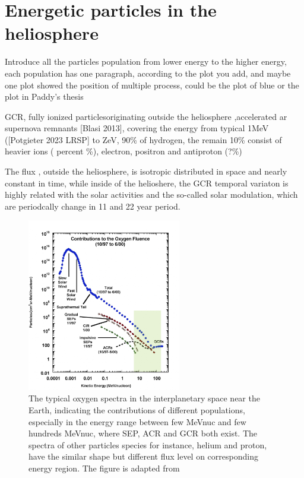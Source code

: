 \section{Energetic particles in the heliosphere}
\label{sec:particles_heliosphere}

Introduce all the particles population from lower energy to the higher energy, each population has one paragraph, according to the plot you add, and maybe one plot showed the position of multiple process, could be the plot of blue or the plot in Paddy's thesis



GCR, fully ionized particlesoriginating outside the heliosphere ,accelerated ar supernova remnants [Blasi 2013], covering the energy from typical 1MeV ([Potgieter 2023 LRSP] to ZeV, 90\% of hydrogen, the remain 10\% consist of heavier ions ( percent \%), electron, positron and antiproton (?\%)


The flux , outside the heliosphere,  is isotropic distributed in space and nearly constant in time, while inside of the helioshere, the GCR temporal variaton is highly related with the solar activities and the so-called solar modulation, which are periodcally change in 11 and 22 year period. 






\begin{figure}
	\centering
	\includegraphics[width = 0.6\textwidth]{images/heliospheric_particle_spectra_color.png}
	\caption[Energy spectra of oxygen ions in the near Earth space]{The typical oxygen spectra in the interplanetary space near the Earth, indicating the contributions of different populations, especially in the energy range between few MeV\/nuc and few hundreds MeV\/nuc, where \acs{SEP}, \acs{ACR} and \acs{GCR} both exist. The spectra of other particles species for instance, helium and proton, have the similar shape but different flux level on corresponding energy region. The figure is adapted from \cite{Mewaldt-2001}}
	\label{Fig:Oxygen_spectra_heliosphere}
\end{figure}

